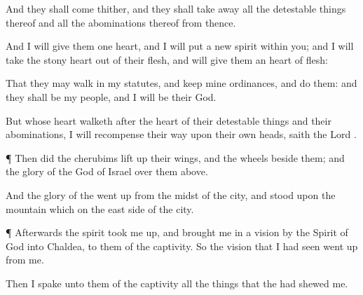 {And they shall
come thither, and they shall take
away all the detestable
things thereof and all the
abominations thereof from thence.

And I will
give them
one
heart, and I will
put a
new
spirit
within you; and I will
take the
stony
heart out of their
flesh, and will
give them an
heart of
flesh:

That they may
walk in my
statutes, and
keep mine
ordinances, and
do them: and they shall be my
people, and I will be their
God.

But
{} whose
heart
walketh after the
heart of their detestable
things and their
abominations, I will
recompense their
way upon their own
heads,
saith the
Lord
{}.


\par }{\PP {}¶ Then did the
cherubims lift
up their
wings, and the
wheels
beside them; and the
glory of the
God of
Israel
{} over them
above.

And the
glory of the
{} went
up from the
midst of the
city, and
stood upon the
mountain which
{} on the east
side of the
city.


\par }{\PP {}¶ Afterwards the
spirit took me
up, and
brought me in a
vision by the
Spirit of
God into
Chaldea, to them of the
captivity. So the
vision that I had
seen went
up from me.

Then I
spake unto them of the
captivity all the
things that the
{} had
shewed me.




\par }

